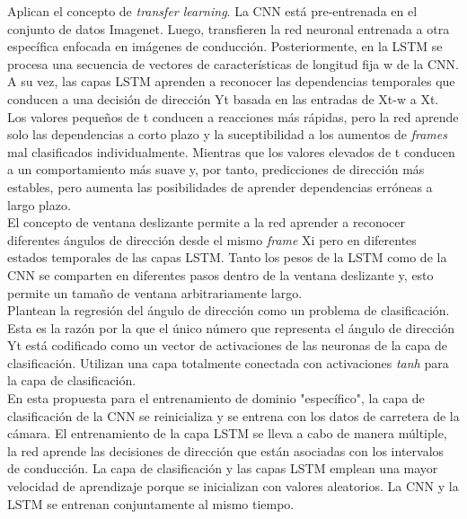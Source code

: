 Aplican el concepto de \textit{transfer learning}. La CNN está pre-entrenada en el conjunto de datos Imagenet. Luego, transfieren la red neuronal entrenada a otra específica enfocada en imágenes de conducción. Posteriormente, en la LSTM se procesa una secuencia de vectores de características de longitud fija w de la CNN. A su vez, las capas LSTM aprenden a reconocer las dependencias temporales que conducen a una decisión de dirección Yt basada en las entradas de Xt-w a Xt. Los valores pequeños de t conducen a reacciones más rápidas, pero la red aprende solo las dependencias a corto plazo y la suceptibilidad a los aumentos de \textit{frames} mal clasificados individualmente. Mientras que los valores elevados de t conducen a un comportamiento más suave y, por tanto, predicciones de dirección más estables, pero aumenta las posibilidades de aprender dependencias erróneas a largo plazo.\\

El concepto de ventana deslizante permite a la red aprender a reconocer diferentes ángulos de dirección desde el mismo \textit{frame} Xi pero en diferentes estados temporales de las capas LSTM. Tanto los pesos de la LSTM como de la CNN se comparten en diferentes pasos dentro de la ventana deslizante y, esto permite un tamaño de ventana arbitrariamente largo.\\

Plantean la regresión del ángulo de dirección como un problema de clasificación. Esta es la razón por la que el único número que representa el ángulo de dirección Yt está codificado como un vector de activaciones de las neuronas de la capa de clasificación. Utilizan una capa totalmente conectada con activaciones \textit{tanh} para la capa de clasificación.\\

En esta propuesta para el entrenamiento de dominio "específico", la capa de clasificación de la CNN se reinicializa y se entrena con los datos de carretera de la cámara. El entrenamiento de la capa LSTM se lleva a cabo de manera múltiple, la red aprende las decisiones de dirección que están asociadas con los intervalos de conducción. La capa de clasificación y las capas LSTM emplean una mayor velocidad de aprendizaje porque se inicializan con valores aleatorios. La CNN y la LSTM se entrenan conjuntamente al mismo tiempo.\\

